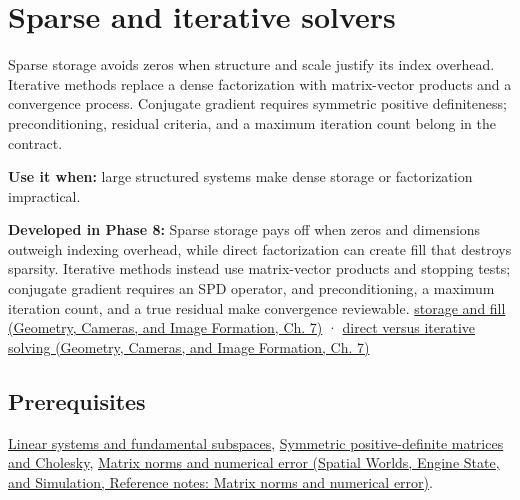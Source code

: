 \hypertarget{appendix-67c87a3d9e94}{}\label{referencestart:appendix-67c87a3d9e94}
\section{Sparse and iterative solvers}\label{appendix-67c87a3d9e94-sparse-and-iterative-solvers}

\hypertarget{appendix-67c87a3d9e94-sparse-and-iterative-solvers}{}

Sparse storage avoids zeros when structure and scale justify its index overhead. Iterative methods replace a dense factorization with matrix-vector products and a convergence process. Conjugate gradient requires symmetric positive definiteness; preconditioning, residual criteria, and a maximum iteration count belong in the contract.

\textbf{Use it when:} large structured systems make dense storage or factorization impractical.

\textbf{Developed in Phase 8:} Sparse storage pays off when zeros and dimensions outweigh indexing overhead, while direct factorization can create fill that destroys sparsity. Iterative methods instead use matrix-vector products and stopping tests; conjugate gradient requires an SPD operator, and preconditioning, a maximum iteration count, and a true residual make convergence reviewable. \href{../03-Geometry-Cameras-and-Image-Formation/main.pdf\#nameddest=02-foundations-ii-ch038-sparse-storage-changes-the-cost-model}{storage and fill (Geometry, Cameras, and Image Formation, Ch. 7)} · \href{../03-Geometry-Cameras-and-Image-Formation/main.pdf\#nameddest=02-foundations-ii-ch038-direct-and-iterative-solvers-suit-different-workloads}{direct versus iterative solving (Geometry, Cameras, and Image Formation, Ch. 7)}

\subsection{Prerequisites}\label{appendix-67c87a3d9e94-prerequisites}

\hypertarget{appendix-67c87a3d9e94-prerequisites}{}

\hyperref[appendix-8572a4a060c1]{Linear systems and fundamental subspaces}, \hyperref[appendix-50d2ea3c9b26]{Symmetric positive-definite matrices and Cholesky}, \href{../05-Spatial-Worlds-Engine-State-and-Simulation/main.pdf\#nameddest=appendix-f8657bac66e5}{Matrix norms and numerical error (Spatial Worlds, Engine State, and Simulation, Reference notes: Matrix norms and numerical error)}.

